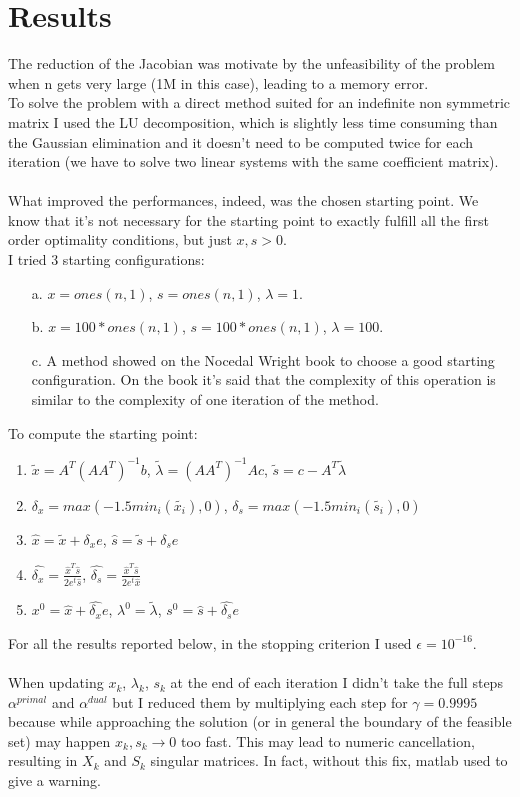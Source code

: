 \documentclass[]{article}
\begin{document}
\section{Results}
The reduction of the Jacobian was motivate by the unfeasibility of the problem when n gets very large (1M in this case), leading to a memory error.\\
To solve the problem with a direct method suited for an indefinite non symmetric matrix I used the LU decomposition, which is slightly less time consuming than the Gaussian elimination and it doesn't need to be computed twice for each iteration (we have to solve two linear systems with the same coefficient matrix).\\\\
What improved the performances, indeed, was the chosen starting point. We know that it's not necessary for the starting point to exactly fulfill all the first order optimality conditions, but just $x, s > 0$.\\
I tried 3 starting configurations:
\begin{enumerate}
	\item [a.]$x=ones(n,1)$, $s=ones(n,1)$, $\lambda = 1$.
	\item [b.]$x=100*ones(n,1)$, $s=100*ones(n,1)$,
	 $\lambda = 100$.
	 \item [c.] A method showed on the Nocedal Wright book to choose a good starting configuration. On the book it's said that the complexity of this operation is similar to the complexity of one iteration of the method.
\end{enumerate} 
To compute the starting point:
\begin{enumerate}
	\item $\tilde{x} = A^T(AA^T)^{-1}b$, $\tilde{\lambda} = (AA^T)^{-1}Ac$, $\tilde{s} = c-A^T\tilde{\lambda}$
	\item $\delta_x=max(-1.5min_i(\tilde{x_i}),0)$, $\delta_s=max(-1.5min_i(\tilde{s_i}),0)$
	\item $\hat{x} = \tilde{x} + \delta_xe$, $\hat{s} = \tilde{s} + \delta_se$
	\item $\hat{\delta_x}=\frac{\hat{x}^T\hat{s}}{2e^t\hat{s}}$, $\hat{\delta_s}=\frac{\hat{x}^T\hat{s}}{2e^t\hat{x}}$
	\item $x^0 = \hat{x} + \hat{\delta_x}e$, $\lambda^0=\tilde{\lambda}$, $s^0 = \hat{s} + \hat{\delta_s}e$
\end{enumerate}
For all the results reported below, in the stopping criterion I used $\epsilon=10^{-16}$.\\\\
When updating $x_k$, $\lambda_k$, $s_k$ at the end of each iteration I didn't take the full steps $\alpha^{primal}$ and $\alpha^{dual}$ but I reduced them by multiplying each step for $\gamma= 0.9995$ because while approaching the solution (or in general the boundary of the feasible set) may happen $x_k,s_k \to0$ too fast. This may lead to numeric cancellation, resulting in $X_k$ and $S_k$ singular matrices. In fact, without this fix, matlab used to give a warning. 
\pagebreak
\end{document}
